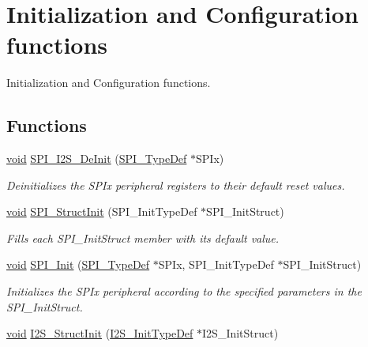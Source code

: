 \hypertarget{group___s_p_i___group1}{\section{Initialization and Configuration functions}
\label{group___s_p_i___group1}
}


Initialization and Configuration functions.  


\subsection*{Functions}
\begin{DoxyCompactItemize}
\item 
\hyperlink{group___n_a_m_e_ga18028b8badbf1ea7e704ccac3c488e82}{void} \hyperlink{group___s_p_i___group1_gabe36880945fa56785283a9c0092124cc}{S\-P\-I\-\_\-\-I2\-S\-\_\-\-De\-Init} (\hyperlink{struct_s_p_i___type_def}{S\-P\-I\-\_\-\-Type\-Def} $\ast$S\-P\-Ix)
\begin{DoxyCompactList}\small\item\em Deinitializes the S\-P\-Ix peripheral registers to their default reset values. \end{DoxyCompactList}\item 
\hyperlink{group___n_a_m_e_ga18028b8badbf1ea7e704ccac3c488e82}{void} \hyperlink{group___s_p_i___group1_ga9a0116f88cc2c4478c270f05608703f1}{S\-P\-I\-\_\-\-Struct\-Init} (S\-P\-I\-\_\-\-Init\-Type\-Def $\ast$S\-P\-I\-\_\-\-Init\-Struct)
\begin{DoxyCompactList}\small\item\em Fills each S\-P\-I\-\_\-\-Init\-Struct member with its default value. \end{DoxyCompactList}\item 
\hyperlink{group___n_a_m_e_ga18028b8badbf1ea7e704ccac3c488e82}{void} \hyperlink{group___s_p_i___group1_ga8dacc1dc48bf08c0f12da409f4889037}{S\-P\-I\-\_\-\-Init} (\hyperlink{struct_s_p_i___type_def}{S\-P\-I\-\_\-\-Type\-Def} $\ast$S\-P\-Ix, S\-P\-I\-\_\-\-Init\-Type\-Def $\ast$S\-P\-I\-\_\-\-Init\-Struct)
\begin{DoxyCompactList}\small\item\em Initializes the S\-P\-Ix peripheral according to the specified parameters in the S\-P\-I\-\_\-\-Init\-Struct. \end{DoxyCompactList}\item 
\hyperlink{group___n_a_m_e_ga18028b8badbf1ea7e704ccac3c488e82}{void} \hyperlink{group___s_p_i___group1_ga7470ec1d0759fdeeb42c7fe71a3b41b7}{I2\-S\-\_\-\-Struct\-Init} (\hyperlink{struct_i2_s___init_type_def}{I2\-S\-\_\-\-Init\-Type\-Def} $\ast$I2\-S\-\_\-\-Init\-Struct)

\end{DoxyCompactItemize}
